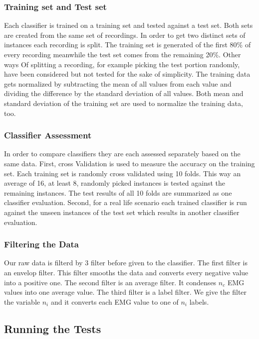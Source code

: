 \documentclass[journal]{IEEEtran}
\begin{document}
\subsubsection{Training set and Test set}

Each classifier is trained on a training set and tested against a test set. Both sets are created from the same set of recordings. In order to get two distinct sets of instances each recording is split. The training set is generated of the first 80\% of every recording meanwhile the test set comes from the remaining 20\%. Other ways Of splitting a recording, for example picking the test portion randomly, have been considered but not tested for the sake of simplicity.
The training data gets normalized by subtracting the mean of all values from each value and dividing the difference by the standard deviation of all values. Both mean and standard deviation of the training set are used to normalize the training data, too. 

\subsubsection{Classifier Assessment}

In order to compare classifiers they are each assessed separately based on the same data. First, cross Validation is used to measure the accuracy on the training set. Each training set is randomly cross validated using 10 folds. This way an average of 16, at least 8, randomly picked instances is tested against the remaining instances. The test results of all 10 folds are summarized as one classifier evaluation. Second, for a real life scenario each trained classifier is run against the unseen instances of the test set which results in another classifier evaluation.

\subsubsection{Filtering the Data}

Our raw data is filterd by 3 filter before given to the classifier. The first filter is an envelop filter. This filter smooths the data and converts every negative value into a positive one. 
The second filter is an average filter. It condenses $n_c$ EMG values into one average value.
The third filter is a label filter. We give the filter the variable $n_i$ and it converts each EMG value to one of $n_i$ labels.    

\subsection{Running the Tests}
\end{document}
